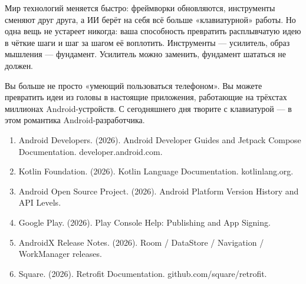 Мир технологий меняется быстро: фреймворки обновляются, инструменты сменяют друг друга, а ИИ берёт на себя всё больше «клавиатурной» работы. Но одна вещь не устареет никогда: ваша способность превратить расплывчатую идею в чёткие шаги и шаг за шагом её воплотить. Инструменты — усилитель, образ мышления — фундамент. Усилитель можно заменить, фундамент шататься не должен.

Вы больше не просто «умеющий пользоваться телефоном». Вы можете превратить идеи из головы в настоящие приложения, работающие на трёхстах миллионах Android-устройств. С сегодняшнего дня творите с клавиатурой — в этом романтика Android-разработчика.


\begin{enumerate}
  \item Android Developers. (2026). Android Developer Guides and Jetpack Compose Documentation. developer.android.com.
  \item Kotlin Foundation. (2026). Kotlin Language Documentation. kotlinlang.org.
  \item Android Open Source Project. (2026). Android Platform Version History and API Levels.
  \item Google Play. (2026). Play Console Help: Publishing and App Signing.
  \item AndroidX Release Notes. (2026). Room / DataStore / Navigation / WorkManager releases.
  \item Square. (2026). Retrofit Documentation. github.com/square/retrofit.
\end{enumerate}
